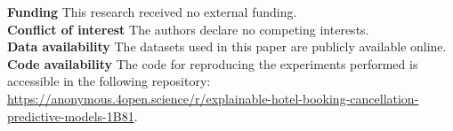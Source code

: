 \documentclass[pdflatex,sn-mathphys-ay]{sn-jnl}
\theoremstyle{thmstyleone}%
\theoremstyle{thmstyletwo}%
\theoremstyle{thmstylethree}%
\begin{document}
\noindent \textbf{Funding} This research received no external funding.\\

\noindent \textbf{Conflict of interest} The authors declare no competing interests.\\

\noindent \textbf{Data availability} The datasets used in this paper are publicly available online.\\

\noindent \textbf{Code availability} The code for reproducing the experiments performed is accessible in the following repository: \url{https://anonymous.4open.science/r/explainable-hotel-booking-cancellation-predictive-models-1B81}.\\


\end{document}
